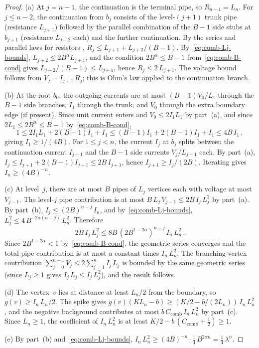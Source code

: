 \documentclass[11pt]{amsart}
\theoremstyle{plain}
\theoremstyle{definition}
\begin{document}
	\begin{proof}
		(a)\; At $j=n{-}1$, the continuation is the terminal pipe, so $R_{n-1}=L_n$.  For $j\leq n{-}2$, the continuation from $b_j$ consists of the level-$(j{+}1)$ trunk pipe (resistance $L_{j+1}$) followed by the parallel combination of the $B{-}1$ side stubs at $b_{j+1}$ (resistance $L_{j+2}$ each) and the further continuation.  By the series and parallel laws for resistors \citep[Section~2.3]{LP16}, $R_j\leq L_{j+1}+L_{j+2}/(B{-}1)$.  By~\eqref{eq:comb-Lj-bounds}, $L_{j+2}\leq 2B^{\alpha}L_{j+1}$, and the condition $2B^{\alpha}\leq B{-}1$ from~\eqref{eq:comb-B-cond} gives $L_{j+2}/(B{-}1)\leq L_{j+1}$, hence $R_j\leq 2\,L_{j+1}$.  The voltage bound follows from $V_j=I_{j+1}\,R_j$; this is Ohm's law applied to the continuation branch.
		
		\medskip
		(b)\; At the root $b_0$, the outgoing currents are at most $(B{-}1)V_0/L_1$ through the $B{-}1$ side branches, $I_1$ through the trunk, and $V_0$ through the extra boundary edge (if present).  Since unit current enters and $V_0\leq 2I_1 L_1$ by part~(a), and since $2L_1\leq 2B^{\alpha}\leq B{-}1$ by~\eqref{eq:comb-B-cond},
		\[
		1\leq 2I_1 L_1 + 2(B{-}1)I_1 + I_1 \leq (B{-}1)I_1 + 2(B{-}1)I_1 + I_1 \leq 4B\,I_1\,,
		\]
		giving $I_1\geq 1/(4B)$.  For $1\leq j<n$, the current $I_j$ at $b_j$ splits between the continuation current $I_{j+1}$ and the $B{-}1$ side currents $V_j/L_{j+1}$ each.  By part~(a), $I_j\leq I_{j+1}+2(B{-}1)I_{j+1}\leq 2B\,I_{j+1}$, hence $I_{j+1}\geq I_j/(2B)$.  Iterating gives $I_n\geq(4B)^{-n}$.
		
		\medskip
		(c)\; At level~$j$, there are at most $B$ pipes of $L_j$ vertices each with voltage at most $V_{j-1}$.  The level-$j$ pipe contribution is at most $B\,L_j\,V_{j-1}\leq 2B\,I_j\,L_j^2$ by part~(a).  By part~(b), $I_j\leq(2B)^{n-j}\,I_n$, and by~\eqref{eq:comb-Lj-bounds}, $L_j^2\leq 4\,B^{-2\alpha(n-j)}\,L_n^2$.  Therefore
		\[
		2B\,I_j\,L_j^2\leq 8B\,(2B^{1-2\alpha})^{n-j}\,I_n\,L_n^2\,.
		\]
		Since $2B^{1-2\alpha}<1$ by~\eqref{eq:comb-B-cond}, the geometric series converges and the total pipe contribution is at most a constant times $I_n\,L_n^2$.  The branching-vertex contribution $\sum_{j=0}^{n-1}V_j\leq 2\sum_{j=1}^{n}I_j\,L_j$ is bounded by the same geometric series (since $L_j\geq 1$ gives $I_j\,L_j\leq I_j\,L_j^2$), and the result follows.
		
		\medskip
		(d)\; The vertex~$v$ lies at distance at least $L_n/2$ from the boundary, so $g(v)\geq I_n\,L_n/2$.  The spike gives $g(v)(KL_n - b)\geq (K/2 - b/(2L_n))\,I_n\,L_n^2$, and the negative background contributes at most $b\,C_{\mathrm{comb}}\,I_n\,L_n^2$ by part~(c).  Since $L_n\geq 1$, the coefficient of $I_n\,L_n^2$ is at least $K/2 - b\,(C_{\mathrm{comb}}+\tfrac{1}{2})\geq 1$.
		
		\medskip
		(e)\; By part~(b) and~\eqref{eq:comb-Lj-bounds}, $I_n\,L_n^2\geq(4B)^{-n}\cdot\tfrac{1}{4}\,B^{2\alpha n}=\tfrac{1}{4}\,\lambda^n$.
	\end{proof}
	
\end{document}
